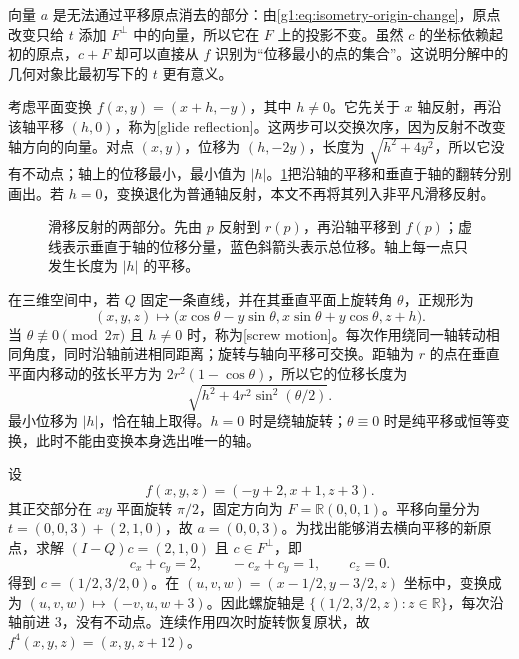 向量 \(a\) 是无法通过平移原点消去的部分：由\eqref{g1:eq:isometry-origin-change}，原点改变只给 \(t\) 添加 \(F^\perp\) 中的向量，所以它在 \(F\) 上的投影不变。虽然 \(c\) 的坐标依赖起初的原点，\(c+F\) 却可以直接从 \(f\) 识别为“位移最小的点的集合”。这说明分解中的几何对象比最初写下的 \(t\) 更有意义。

\begin{example}
	\label{g1:exm:glide-reflection}
	考虑平面变换 \(f(x,y)=(x+h,-y)\)，其中 \(h\ne0\)。它先关于 \(x\) 轴反射，再沿该轴平移 \((h,0)\)，称为[glide reflection]。这两步可以交换次序，因为反射不改变轴方向的向量。对点 \((x,y)\)，位移为 \((h,-2y)\)，长度为 \(\sqrt{h^2+4y^2}\)，所以它没有不动点；轴上的位移最小，最小值为 \(|h|\)。\cref{g1:fig:glide-displacement}把沿轴的平移和垂直于轴的翻转分别画出。若 \(h=0\)，变换退化为普通轴反射，本文不再将其列入非平凡滑移反射。
\end{example}

\begin{figure}[htbp]
	\centering
	
	\caption[滑移反射的两部分]{滑移反射的两部分。先由 \(p\) 反射到 \(r(p)\)，再沿轴平移到 \(f(p)\)；虚线表示垂直于轴的位移分量，蓝色斜箭头表示总位移。轴上每一点只发生长度为 \(|h|\) 的平移。}
	\label{g1:fig:glide-displacement}
\end{figure}

在三维空间中，若 \(Q\) 固定一条直线，并在其垂直平面上旋转角 \(\theta\)，正规形为
\[
	(x,y,z)\longmapsto
	\bigl(x\cos\theta-y\sin\theta,
	x\sin\theta+y\cos\theta,z+h\bigr).
\]
当 \(\theta\not\equiv0\pmod{2\pi}\) 且 \(h\ne0\) 时，称为[screw motion]。每次作用绕同一轴转动相同角度，同时沿轴前进相同距离；旋转与轴向平移可交换。距轴为 \(r\) 的点在垂直平面内移动的弦长平方为 \(2r^2(1-\cos\theta)\)，所以它的位移长度为
\[
	\sqrt{h^2+4r^2\sin^2(\theta/2)}.
\]
最小位移为 \(|h|\)，恰在轴上取得。\(h=0\) 时是绕轴旋转；\(\theta\equiv0\) 时是纯平移或恒等变换，此时不能由变换本身选出唯一的轴。

\begin{example}
	\label{g1:exm:screw-axis}
	设
	\[
		f(x,y,z)=(-y+2,x+1,z+3).
	\]
	其正交部分在 \(xy\) 平面旋转 \(\pi/2\)，固定方向为 \(F=\mathbb R(0,0,1)\)。平移向量分为 \(t=(0,0,3)+(2,1,0)\)，故 \(a=(0,0,3)\)。为找出能够消去横向平移的新原点，求解 \((I-Q)c=(2,1,0)\) 且 \(c\in F^\perp\)，即
	\[
		c_x+c_y=2,\qquad -c_x+c_y=1,\qquad c_z=0.
	\]
	得到 \(c=(1/2,3/2,0)\)。在 \((u,v,w)=(x-1/2,y-3/2,z)\) 坐标中，变换成为 \((u,v,w)\mapsto(-v,u,w+3)\)。因此螺旋轴是 \(\{(1/2,3/2,z):z\in\mathbb R\}\)，每次沿轴前进 \(3\)，没有不动点。连续作用四次时旋转恢复原状，故 \(f^4(x,y,z)=(x,y,z+12)\)。
\end{example}

